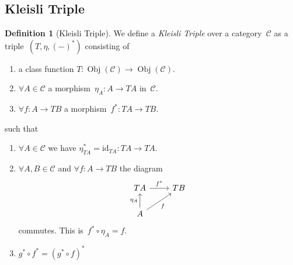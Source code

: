 \documentclass[a4paper]{article}
\theoremstyle{plain}
\theoremstyle{definition}
\newtheorem{definition}[theorem]{Definition}
\DeclareMathOperator{\Obj}{Obj}
\newcommand{\id}{\mathrm{id}}
\newcommand{\cat}[1]{\mathcal{#1}}
\begin{document}
\subsection{Kleisli Triple}
\begin{definition}[Kleisli Triple]
    We define a \emph{Kleisli Triple} over a category~\(\cat{C}\)
    as a triple~\((T, \eta, (-)^{\ast})\) consisting of
    \begin{enumerate}
        \item a class function
            \(T:\Obj(\cat{C})\longrightarrow\Obj(\cat{C})\).
        \item \(\forall A\in\cat{C}\)
            a morphism~\(\eta_{A}:A\longrightarrow TA\)
            in~\(\cat{C}\).
        \item \(\forall f:A\longrightarrow TB\)
            a morphism~\(f^{\ast}:TA\longrightarrow TB\).
    \end{enumerate}
    such that
    \begin{enumerate}
        \item \(\forall A\in\cat{C}\) we have
            \(\eta^{\ast}_{TA} = \id_{TA}:TA\longrightarrow TA\).
        \item \(\forall A,B\in\cat{C}\)
            and \(\forall f:A\longrightarrow TB\)
            the diagram
            \[\begin{tikzcd}
                TA \arrow[r, "f^{\ast}"] & TB \\
                A \arrow[u, "\eta_{A}"] \arrow[ur, "f", swap] &
            \end{tikzcd}\]
            commutes. This is~\(f^{\ast}\circ\eta_{A} = f\).
        \item \(g^{\ast}\circ f^{\ast} = (g^{\ast}\circ f)^{\ast}\)
    \end{enumerate}
\end{definition}
\end{document}

